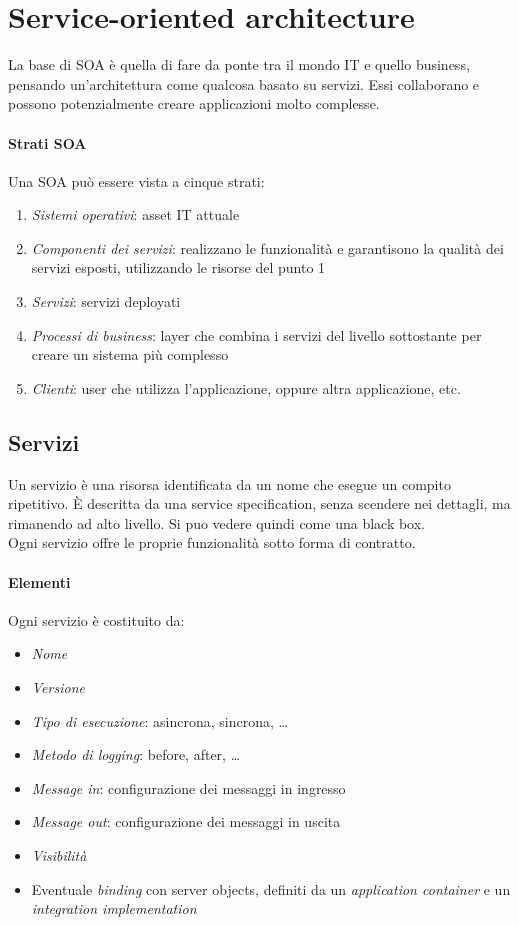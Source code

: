 \section{Service-oriented architecture}
La base di SOA è quella di fare da ponte tra il mondo IT e quello business, 
pensando un'architettura come qualcosa basato su servizi.
Essi collaborano e possono potenzialmente creare applicazioni molto complesse.

\paragraph{Strati SOA}
Una SOA può essere vista a cinque strati:
\begin{enumerate}
    \item \emph{Sistemi operativi}: asset IT attuale
    \item \emph{Componenti dei servizi}: realizzano le funzionalità e garantisono la qualità
    dei servizi esposti, utilizzando le risorse del punto 1
    \item \emph{Servizi}: servizi deployati
    \item \emph{Processi di business}: layer che combina i servizi del livello sottostante
    per creare un sistema più complesso
    \item \emph{Clienti}: user che utilizza l'applicazione, oppure altra applicazione, etc. 
\end{enumerate}

\subsection{Servizi}
Un servizio è una risorsa identificata da un nome che esegue un compito ripetitivo.
È descritta da una service specification, senza scendere nei dettagli, ma rimanendo 
ad alto livello. Si puo vedere quindi come una black box.\\
Ogni servizio offre le proprie funzionalità sotto forma di contratto.
\paragraph{Elementi}
Ogni servizio è costituito da:
\begin{itemize}
    \item \emph{Nome}
    \item \emph{Versione}
    \item \emph{Tipo di esecuzione}: asincrona, sincrona, \dots
    \item \emph{Metodo di logging}: before, after, \dots
    \item \emph{Message in}: configurazione dei messaggi in ingresso
    \item \emph{Message out}: configurazione dei messaggi in uscita
    \item \emph{Visibilità}
    \item Eventuale \emph{binding} con server objects, definiti da un \emph{application 
    container} e un \emph{integration implementation}
\end{itemize}


